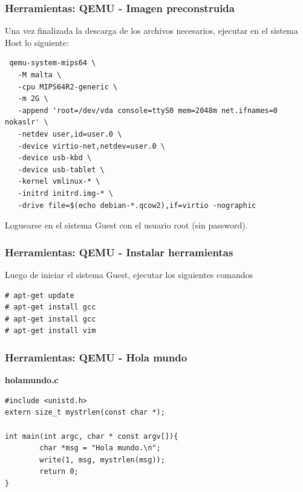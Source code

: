 \documentclass{beamer}
\begin{document}
\begin{frame}[fragile]
 \frametitle{Herramientas: QEMU - Imagen preconstruida}
Una vez finalizada la descarga de los archivos necesarios, ejecutar en el sistema Host lo siguiente:

\begin{lstlisting}
 qemu-system-mips64 \
   -M malta \
   -cpu MIPS64R2-generic \
   -m 2G \
   -append 'root=/dev/vda console=ttyS0 mem=2048m net.ifnames=0 nokaslr' \
   -netdev user,id=user.0 \
   -device virtio-net,netdev=user.0 \
   -device usb-kbd \
   -device usb-tablet \
   -kernel vmlinux-* \
   -initrd initrd.img-* \
   -drive file=$(echo debian-*.qcow2),if=virtio -nographic
\end{lstlisting}

Loguearse en el sistema Guest con el usuario root (sin password).
\end{frame}  


\begin{frame}[fragile]
 \frametitle{Herramientas: QEMU - Instalar herramientas}
Luego de iniciar el sistema Guest, ejecutar los siguientes comandos

 \begin{lstlisting}
# apt-get update
# apt-get install gcc
# apt-get install gcc
# apt-get install vim
 \end{lstlisting}

\end{frame}  



  \begin{frame}[fragile]
 \frametitle{Herramientas: QEMU - Hola mundo} 
\textbf{holamundo.c}
\begin{lstlisting}
#include <unistd.h>
extern size_t mystrlen(const char *);

int main(int argc, char * const argv[]){
        char *msg = "Hola mundo.\n";
        write(1, msg, mystrlen(msg));
        return 0;
}

\end{lstlisting}
\end{frame}
\end{document}
